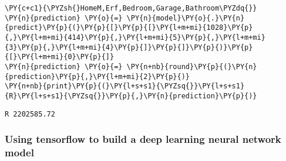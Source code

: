     \begin{tcolorbox}[breakable, size=fbox, boxrule=1pt, pad at break*=1mm,colback=cellbackground, colframe=cellborder]
\begin{Verbatim}[commandchars=\\\{\}]
\PY{c+c1}{\PYZsh{}HomeM,Erf,Bedroom,Garage,Bathroom\PYZdq{}}
\PY{n}{prediction} \PY{o}{=} \PY{n}{model}\PY{o}{.}\PY{n}{predict}\PY{p}{(}\PY{p}{[}\PY{p}{[}\PY{l+m+mi}{1028}\PY{p}{,}\PY{l+m+mi}{414}\PY{p}{,}\PY{l+m+mi}{5}\PY{p}{,}\PY{l+m+mi}{3}\PY{p}{,}\PY{l+m+mi}{4}\PY{p}{]}\PY{p}{]}\PY{p}{)}\PY{p}{[}\PY{l+m+mi}{0}\PY{p}{]}
\PY{n}{prediction} \PY{o}{=} \PY{n+nb}{round}\PY{p}{(}\PY{n}{prediction}\PY{p}{,}\PY{l+m+mi}{2}\PY{p}{)}
\PY{n+nb}{print}\PY{p}{(}\PY{l+s+s1}{\PYZsq{}}\PY{l+s+s1}{R}\PY{l+s+s1}{\PYZsq{}}\PY{p}{,}\PY{n}{prediction}\PY{p}{)}
\end{Verbatim}
\end{tcolorbox}

    \begin{Verbatim}[commandchars=\\\{\}]
R 2202585.72
    \end{Verbatim}

    \hypertarget{using-tensorflow-to-build-a-deep-learning-neural-network-model}{%
\subsubsection{Using tensorflow to build a deep learning neural network
model}\label{using-tensorflow-to-build-a-deep-learning-neural-network-model}}

